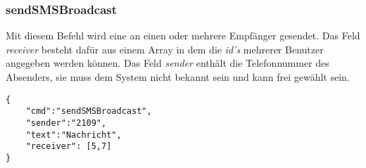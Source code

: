 \subsubsection*{sendSMSBroadcast}
Mit diesem Befehl wird eine \SMS an einen oder mehrere Empfänger gesendet. Das Feld \textit{receiver} besteht dafür aus einem \JSON Array in dem die \textit{id's} mehrerer Benutzer angegeben werden können. Das Feld \textit{sender} enthält die Telefonnummer des Absenders, sie muss dem System nicht bekannt sein und kann frei gewählt sein.

\begin{lstlisting}[style=json]
{
	"cmd":"sendSMSBroadcast",
	"sender":"2109",
	"text":"Nachricht",
	"receiver": [5,7]
}
\end{lstlisting}

